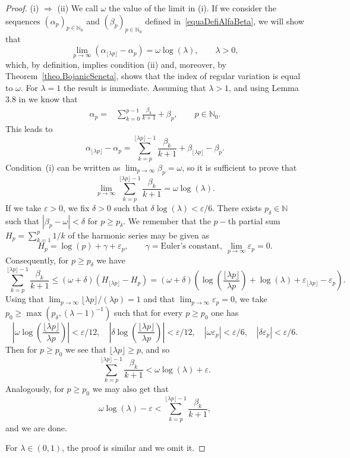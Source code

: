 \documentclass[11pt,a4paper]{article}
\theoremstyle{definition}
\def\oo{\infty}
\def\ri{\rightarrow}
\def\a{\alpha}
\def\b{\beta}
\def\de{\delta}
\def\ep{\varepsilon}
\def\o{\omega}
\def\ga{\gamma}
\def\N{\mathbb{N}}
\def\no{\nonumber}
\begin{document}
\begin{proof} (i) $\Rightarrow$ (ii)  We call $\o$ the value of the limit in (i). If we consider the sequences
$(\a_p)_{p\in\N_0}$ and $(\b_p)_{p\in\N_0}$
defined in~\eqref{equaDefiAlfaBeta}, we will show that
$$\lim_{p\ri\oo}( \a_{\lfloor\lambda p\rfloor}-\a_p)=\o\log(\lambda),\qquad \lambda>0 ,$$
 which, by definition, implies condition (ii) and, moreover, by Theorem~\ref{theo.BojanicSeneta}, shows that the index of regular variation is equal to $\o$. For $\lambda=1$ the result is immediate. Assuming that $\lambda>1$, and using Lemma 3.8 in \cite{JimenezSanz} we know that
\begin{align}
  \a_p=&\sum^{p-1}_{k=0}\frac{\b_k}{k+1}+\b_p, \qquad p\in\N_0.\label{eqalfabeta}
 \end{align}
This leads to
\begin{equation}
 \a_{\lfloor\lambda p\rfloor}-\a_p=\sum^{\lfloor\lambda p\rfloor-1}_{k=p}\frac{\b_k}{k+1}+\b_{\lfloor\lambda p\rfloor}-\b_p.\no
\end{equation}
Condition~(i) can be written as
$\lim_{p\ri\oo}\b_p=\o$,
so it is sufficient to prove that
$$\lim_{p\ri\oo} \sum^{\lfloor\lambda p\rfloor-1}_{k=p}\frac{\b_k}{k+1} =\o\log(\lambda).$$
If we take $\ep>0$, we fix $\delta>0$ such that $\delta\log(\lambda)<\ep/6$.
There exists $p_\delta\in\N$ such that
$|\b_p-\o|<\delta$ for $p\geq p_\delta$.
We remember that the $p-$th partial sum $H_p=\sum_{k=1}^p 1/k$ of the harmonic series may be given as
\begin{equation}\label{equaPartialSumsHarmonic}
H_p=\log(p)+\ga+\ep_p,\qquad \ga=\textrm{Euler's constant},\ \lim_{p\ri\oo} \ep_p=0.
\end{equation}
Consequently, for $p\geq p_\delta$ we have
$$\sum^{\lfloor\lambda p\rfloor-1}_{k=p}\frac{\b_k}{k+1} \leq (\o+\delta) (H_{\lfloor\lambda p\rfloor}-H_p) =
(\o+\delta) \left(\log\left(\frac{\lfloor\lambda p\rfloor}{\lambda p}\right)+\log(\lambda) +\ep_{\lfloor\lambda p\rfloor}-\ep_p\right).$$
Using that $\lim_{p\ri\oo}\lfloor\lambda p\rfloor /(\lambda p) =1$ and that $\lim_{p\ri\oo} \ep_p=0$, we take $p_0\geq \max(p_\delta,(\lambda-1)^{-1})$ such
that for every $p\geq p_0$ one has
$$\left|\o\log\left(\frac{\lfloor\lambda p\rfloor}{\lambda p}\right) \right|<\ep/12, \quad
\left|\de\log\left(\frac{\lfloor\lambda p\rfloor}{\lambda p}\right) \right|<\ep/12,\quad |\o\ep_p|<\ep/6,
\quad |\de\ep_p|<\ep/6.$$
Then for $p\geq p_0$ we see that $\lfloor\lambda p\rfloor\ge p$, and so
$$\sum^{\lfloor\lambda p\rfloor-1}_{k=p}\frac{\b_k}{k+1} <\o\log(\lambda)+\ep.$$
Analogously, for $p\geq p_0$ we may also get that
$$ \o\log(\lambda)-\ep<\sum^{\lfloor\lambda p\rfloor-1}_{k=p}\frac{\b_k}{k+1},$$
and we are done.\par
For $\lambda\in(0,1)$, the proof is similar and we omit it.


\end{proof}
\end{document}
